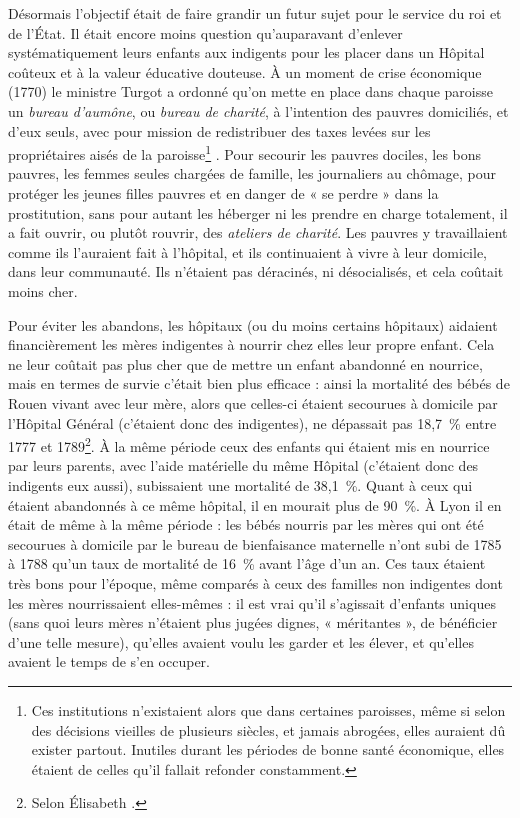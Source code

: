  Désormais l'objectif était de faire grandir un futur sujet pour le service du roi et de l'État. Il était encore moins question qu'auparavant d'enlever systématiquement leurs enfants aux indigents pour les placer dans un Hôpital coûteux et à la valeur éducative douteuse. À un moment de crise économique (1770) le ministre Turgot a ordonné qu'on mette en place dans chaque paroisse un \emph{bureau d'aumône}, ou \emph{bureau de charité}, à l'intention des pauvres domiciliés, et d'eux seuls, avec pour mission de redistribuer des taxes levées sur les propriétaires aisés de la paroisse\footnote{Ces institutions n'existaient alors que dans certaines paroisses, même si selon des décisions vieilles de plusieurs siècles, et jamais abrogées, elles auraient dû exister partout. Inutiles durant les périodes de bonne santé économique, elles étaient de celles qu'il fallait refonder constamment.}%
. Pour secourir les pauvres dociles, les bons pauvres, les femmes seules chargées de famille, les journaliers au chômage, pour protéger les jeunes filles pauvres et en danger de « se perdre » dans la prostitution, sans pour autant les héberger ni les prendre en charge totalement, il a fait ouvrir, ou plutôt rouvrir, des \emph{ateliers de charité}. Les pauvres y travaillaient comme ils l'auraient fait à l'hôpital, et ils continuaient à vivre à leur domicile, dans leur communauté. Ils n'étaient pas déracinés, ni désocialisés, et cela coûtait moins cher. 

 Pour éviter les abandons, les hôpitaux (ou du moins certains hôpitaux) aidaient financièrement les mères indigentes à nourrir chez elles leur propre enfant. Cela ne leur coûtait pas plus cher que de mettre un enfant abandonné en nourrice, mais en termes de survie c'était bien plus efficace : ainsi la mortalité des bébés de Rouen vivant avec leur mère, alors que celles-ci étaient secourues à domicile par l'Hôpital Général (c'étaient donc des indigentes), ne dépassait pas 18,7~\% entre 1777 et 1789\footnote{Selon Élisabeth .}. À la même période ceux des enfants qui étaient mis en nourrice par leurs parents, avec l'aide matérielle du même Hôpital (c'étaient donc des indigents eux aussi), subissaient une mortalité de 38,1~\%. Quant à ceux qui étaient abandonnés à ce même hôpital, il en mourait plus de 90~\%. À Lyon il en était de même à la même période : les bébés nourris par les mères qui ont été secourues à domicile par le bureau de bienfaisance maternelle n'ont subi de 1785 à 1788 qu'un taux de mortalité de 16~\% avant l'âge d'un an. Ces taux étaient très bons pour l'époque, même comparés à ceux des familles non indigentes dont les mères nourrissaient elles-mêmes : il est vrai qu'il s'agissait d'enfants uniques (sans quoi leurs mères n'étaient plus jugées dignes, « méritantes », de bénéficier d'une telle mesure), qu'elles avaient voulu les garder et les élever, et qu'elles avaient le temps de s'en occuper.

